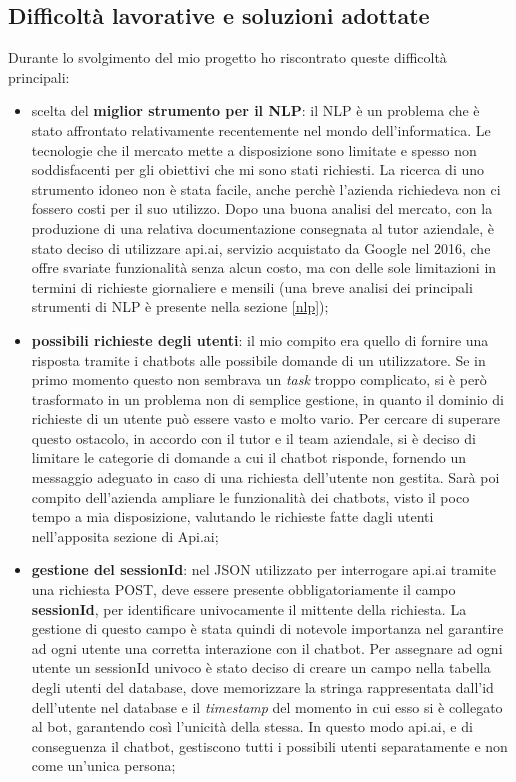 \subsection{Difficoltà lavorative e soluzioni adottate}
Durante lo svolgimento del mio progetto ho riscontrato queste difficoltà principali:
\begin{itemize}
	\item scelta del \textbf{miglior strumento per il \gls{NLP}}: il \gls{NLP} è un problema che è stato affrontato relativamente recentemente nel mondo dell'informatica. Le tecnologie che il mercato mette a disposizione sono limitate e spesso non soddisfacenti per gli obiettivi che mi sono stati richiesti. La ricerca di uno strumento idoneo non è stata facile, anche perchè l'azienda richiedeva non ci fossero costi per il suo utilizzo. Dopo una buona analisi del mercato, con la produzione di una relativa documentazione consegnata al tutor aziendale, è stato deciso di utilizzare api.ai, servizio acquistato da Google nel 2016, che offre svariate funzionalità senza alcun costo, ma con delle sole limitazioni in termini di richieste giornaliere e mensili (una breve analisi dei principali strumenti di NLP è presente nella sezione \ref{nlp});
	\item \textbf{possibili richieste degli utenti}: il mio compito era quello di fornire una risposta tramite i \glspl{chatbot} alle possibile domande di un utilizzatore. Se in primo momento questo non sembrava un \emph{task} troppo complicato, si è però trasformato in un problema non di semplice gestione, in quanto il dominio di richieste di un utente può essere vasto e molto vario. Per cercare di superare questo ostacolo, in accordo con il tutor e il team aziendale, si è deciso di limitare le categorie di domande a cui il \gls{chatbot} risponde, fornendo un messaggio adeguato in caso di una richiesta dell'utente non gestita. Sarà poi compito dell'azienda ampliare le funzionalità dei \glspl{chatbot}, visto il poco tempo a mia disposizione, valutando le richieste fatte dagli utenti nell'apposita sezione di Api.ai;
	\item \textbf{gestione del sessionId}: nel \gls{JSON} utilizzato per interrogare api.ai tramite una richiesta \gls{POST}, deve essere presente obbligatoriamente il campo \textbf{sessionId}, per identificare univocamente il mittente della richiesta. La gestione di questo campo è stata quindi di notevole importanza nel garantire ad ogni utente una corretta interazione con il \gls{chatbot}. Per assegnare ad ogni utente un sessionId univoco è stato deciso di creare un campo nella tabella degli utenti del database, dove memorizzare la stringa rappresentata dall'id dell'utente nel database e il \emph{timestamp} del momento in cui esso si è collegato al bot, garantendo così l'unicità della stessa. In questo modo api.ai, e di conseguenza il \gls{chatbot}, gestiscono tutti i possibili utenti separatamente e non come un'unica persona;

\end{itemize}
